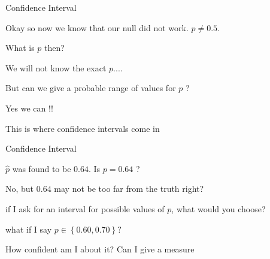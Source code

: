 \documentclass{beamer}\usepackage[]{graphicx}\usepackage[]{color}
\begin{document}
\begin{frame}{Confidence Interval}

Okay so now we know that our null did not work. $p \neq 0.5$. \pause \newline

What is $p$ then? \pause \newline

We will not know the exact $p$.... \pause \newline

But can we give a probable range of values for $p$ ? \pause \newline

Yes we can !! \pause \newline

This is where confidence intervals come in 

\end{frame}


\begin{frame}{Confidence Interval}

$\hat{p}$ was found to be $0.64$. Is $p=0.64$ ? \pause \newline

 No, but $0.64$ may not be too far from the truth right?  \pause \newline

 if I ask for an interval for possible values of $p$, what would you choose?  \pause \newline

 what if I say $p \in \left \{ 0.60, 0.70 \right \} ? $ \pause \newline

 How confident am I about it? Can I give a measure 

\end{frame}
\end{document}

